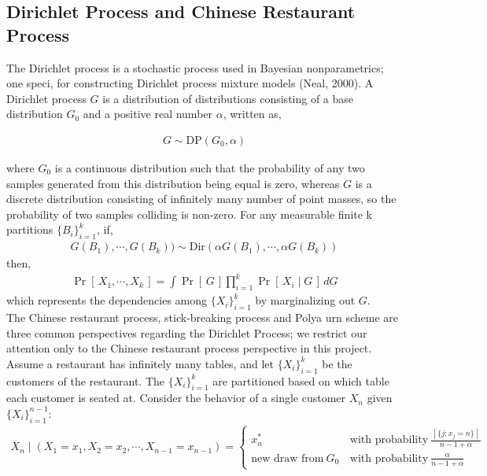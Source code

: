 \documentclass{article}
\newcommand{\prob}[1]{\operatorname{Pr}\left[\,#1\,\right]}
\def\cond{\; | \;}
\begin{document}
\subsection{Dirichlet Process and Chinese Restaurant Process}

The Dirichlet process is a stochastic process used in Bayesian nonparametrics; one speci, for constructing Dirichlet process mixture models (Neal, 2000). A Dirichlet process $G$ is a distribution of distributions consisting of a base distribution $G_0$ and a positive real number $\alpha$, written as,

\begin{align*}
G \sim \text{DP}(G_0, \alpha)
\end{align*}

where $G_0$ is a continuous distribution such that the probability of any two samples generated from this distribution being equal is zero, whereas $G$ is a discrete distribution consisting of infinitely many number of point masses,  so the probability of two samples colliding is non-zero.  For any measurable finite k partitions $\{B_i\}_{i=1}^k$, if,
\begin{align*}
G(B_1), \cdots, G(B_k))\sim \text{Dir}(\alpha G(B_1), \cdots, \alpha G(B_k))
\end{align*}
then,
\begin{align*}
\prob{X_1, \cdots, X_k} = \int \prob{G} \prod_{i=1}^k \prob{X_i\cond G}\,dG
\end{align*}
which represents the dependencies among $\{X_i\}_{i=1}^k$ by marginalizing out $G$. \\

The Chinese restaurant process, stick-breaking process and Polya urn scheme are three common perspectives regarding the Dirichlet Process; we restrict our attention only to the Chinese restaurant process perspective in this project. Assume a restaurant has infinitely many tables,  and let $\{X_i\}_{i=1}^k$ be the customers of the restaurant.  The $\{X_i\}_{i=1}^k$ are partitioned based on which table each customer is seated at.  Consider the behavior of a single customer $X_n$ given $\{X_i\}_{i=1}^{n-1}$:
\begin{align*}
X_n\cond (X_1 = x_1, X_2 = x_2, \cdots,  X_{n-1} = x_{n-1}) = \left\{
\begin{array}{rl}
x_n^* \, &\text{with probability}\ \frac{\cond\{j : x_j = n\}\cond}{n - 1 + \alpha}\\
\text{new draw from}\ G_0\, &\text{with probability}\  \frac{\alpha}{n - 1 + \alpha}
\end{array}
\right.
\end{align*}
\end{document}
